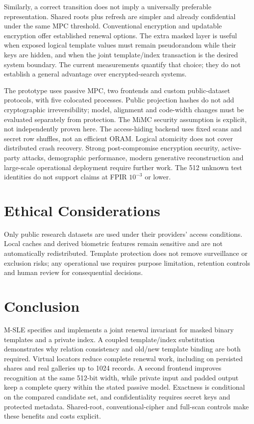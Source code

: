 \documentclass[journal]{IEEEtran}
\newcommand{\MSLE}{\textsc{M-SLE}\xspace}
\begin{document}
Similarly, a correct transition does not imply a universally preferable representation. Shared roots plus refresh are simpler and already confidential under the same MPC threshold. Conventional encryption and updatable encryption offer established renewal options. The extra masked layer is useful when exposed logical template values must remain pseudorandom while their keys are hidden, and when the joint template/index transaction is the desired system boundary. The current measurements quantify that choice; they do not establish a general advantage over encrypted-search systems.

The prototype uses passive MPC, two frontends and custom public-dataset protocols, with five colocated processes. Public projection hashes do not add cryptographic irreversibility; model, alignment and code-width changes must be evaluated separately from protection. The MiMC security assumption is explicit, not independently proven here. The access-hiding backend uses fixed scans and secret row shuffles, not an efficient ORAM. Logical atomicity does not cover distributed crash recovery. Strong post-compromise encryption security, active-party attacks, demographic performance, modern generative reconstruction and large-scale operational deployment require further work. The 512 unknown test identities do not support claims at FPIR $10^{-3}$ or lower.

\section{Ethical Considerations}
Only public research datasets are used under their providers' access conditions. Local caches and derived biometric features remain sensitive and are not automatically redistributed. Template protection does not remove surveillance or exclusion risks; any operational use requires purpose limitation, retention controls and human review for consequential decisions.

\section{Conclusion}
\MSLE specifies and implements a joint renewal invariant for masked binary templates and a private index. A coupled template/index substitution demonstrates why relation consistency and old/new template binding are both required. Virtual locators reduce complete renewal work, including on persisted shares and real galleries up to 1024 records. A second frontend improves recognition at the same 512-bit width, while private input and padded output keep a complete query within the stated passive model. Exactness is conditional on the compared candidate set, and confidentiality requires secret keys and protected metadata. Shared-root, conventional-cipher and full-scan controls make these benefits and costs explicit.
\end{document}
